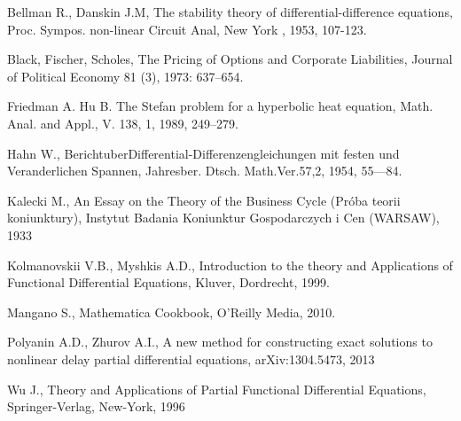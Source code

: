 \begin{thebibliography}{99}
Bellman R., Danskin J.M, The stability theory of differential-difference equations, Proc. Sympos. non-linear Circuit Anal, New York , 1953, 107-123.

Black, Fischer, Scholes, The Pricing of Options and Corporate Liabilities, Journal of Political Economy 81 (3), 1973: 637–654.

Friedman A. Hu B. The Stefan problem for a hyperbolic heat equation, Math. Anal. and Appl., V. 138, 1, 1989, 249–279.

Hahn W., BerichtuberDifferential-Differenzengleichungen mit festen und Veranderlichen Spannen, Jahresber. Dtsch. Math.Ver.57,2, 1954, 55—84.

Kalecki M., An Essay on the Theory of the Business Cycle (Próba teorii koniunktury), Instytut Badania Koniunktur Gospodarczych i Cen (WARSAW), 1933

Kolmanovskii V.B., Myshkis A.D., Introduction to the theory and Applications of Functional Differential Equations, Kluver, Dordrecht, 1999.

Mangano S., Mathematica Cookbook, O'Reilly Media, 2010.

Polyanin A.D., Zhurov A.I., A new method for constructing exact solutions to nonlinear delay partial differential equations, arXiv:1304.5473, 2013

Wu J., Theory and Applications of Partial Functional Differential Equations, Springer-Verlag, New-York, 1996

\end{thebibliography}